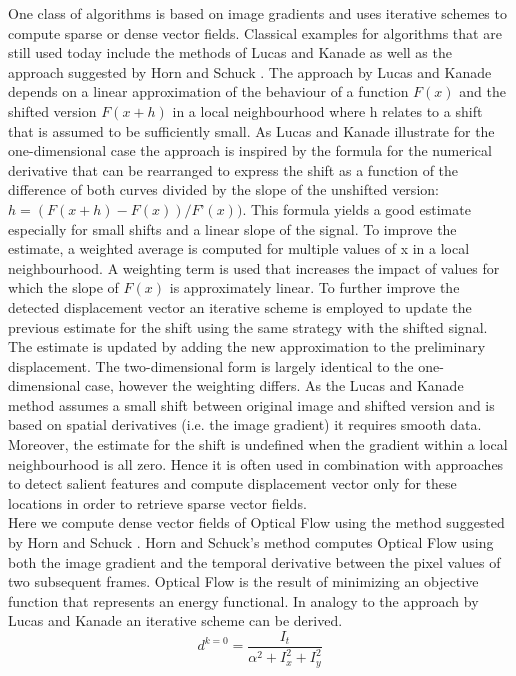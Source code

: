 One class of algorithms is based on image gradients and uses iterative schemes to compute sparse or dense vector fields. Classical examples for algorithms that are still used today include the methods of Lucas and Kanade \parencite*{ lucas1981iterative} as well as the approach suggested by Horn and Schuck \parencite*{ horn1981determining}. The approach by Lucas and Kanade \parencite*{ lucas1981iterative} depends on a linear approximation of the behaviour of a function $F(x)$ and the shifted version $F(x+h)$ in a local neighbourhood where h relates to a shift that is assumed to be sufficiently small. As Lucas and Kanade \parencite*{ lucas1981iterative} illustrate for the one-dimensional case the approach is inspired by the formula for the numerical derivative that can be rearranged to express the shift as a function of the difference of both curves divided by the slope of the unshifted version: $h = (F(x+h)-F(x))/F’(x))$. This formula yields a good estimate especially for small shifts and a linear slope of the signal. To improve the estimate, a weighted average is computed for multiple values of x in a local neighbourhood. A weighting term is used that increases the impact of values for which the slope of $F(x)$ is approximately linear. To further improve the detected displacement vector an iterative scheme is employed to update the previous estimate for the shift using the same strategy with the shifted signal. The estimate is updated by adding the new approximation to the preliminary displacement. The two-dimensional form is largely identical to the one-dimensional case, however the weighting differs. As the Lucas and Kanade \parencite*{ lucas1981iterative} method assumes a small shift between original image and shifted version and is based on spatial derivatives (i.e. the image gradient) it requires smooth data. Moreover, the estimate for the shift is undefined when the gradient within a local neighbourhood is all zero. Hence it is often used in combination with approaches to detect salient features and compute displacement vector only for these locations in order to retrieve sparse vector fields.\\
Here we compute dense vector fields of Optical Flow using the method suggested by Horn and Schuck \parencite*{horn1981determining}. Horn and Schuck’s method computes Optical Flow using both the image gradient and the temporal derivative between the pixel values of two subsequent frames. Optical Flow is the result of minimizing an objective function that represents an energy functional. In analogy to the approach by Lucas and Kanade \parencite*{ lucas1981iterative} an iterative scheme can be derived. \\
\begin{equation}
  d^{k=0} = \frac{I_t}{\alpha^2+I_x^2+I_y^2}
\label{eqn:d_at_it_zero}
\end{equation}

